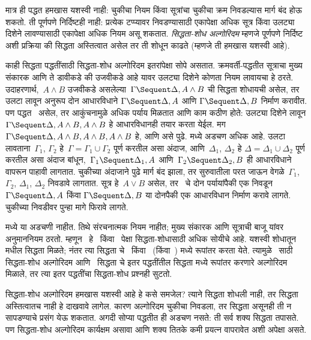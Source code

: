 मात्र ही पद्धत हमखास यशस्वी नाही:
चुकीचा नियम किंवा सूत्रांचा चुकीचा क्रम
निवडल्यास मार्ग बंद होऊ शकतो. ती पूर्णपणे
निर्दिष्टही नाही: प्रत्येक टप्प्यावर निवडण्यासाठी
एकापेक्षा अधिक सूत्र किंवा उलट्या दिशेने
लावण्यासाठी एकापेक्षा अधिक नियम असू शकतात.
\emph{सिद्धता-शोध अल्गोरिदम} म्हणजे पूर्णपणे
निर्दिष्ट अशी प्रक्रिया की सिद्धता अस्तित्वात
असेल तर ती शोधून काढते (म्हणजे ती हमखास यशस्वी आहे).

काही सिद्धता पद्धतींसाठी सिद्धता-शोध
अल्गोरिदम इतरांपेक्षा सोपे असतात. क्रमवर्ती-पद्धतीत
सूत्राचा मुख्य संकारक आणि ते डावीकडे
की उजवीकडे आहे यावर उलट्या दिशेने कोणता नियम
लावायचा हे ठरते. उदाहरणार्थ,~$A \land B$
उजवीकडे असलेल्या~$\Gamma \Sequent \Delta, A \land B$
ची सिद्धता शोधायची असेल, तर~\RightR{\land}
उलटा लावून अनुरूप दोन आधारविधाने
$\Gamma \Sequent \Delta, A$ आणि
$\Gamma \Sequent \Delta, B$ निर्माण करावीत.
पण पद्धत~ असेल, तर आकुंचनामुळे अधिक
पर्याय मिळतात आणि काम कठीण होते: उलट्या दिशेने
\RightR{\Contraction} लावून
$\Gamma \Sequent \Delta, A \land B, A \land B$
हे आधारविधानही तयार करता येईल. मग
$\Gamma \Sequent \Delta, A \land B, A \land B, A \land B$
हे, आणि असे पुढे.  मध्ये अडचण अधिक आहे.
\RightR{\land} उलटा लावताना~$\Gamma_1$, $\Gamma_2$
हे~$\Gamma = \Gamma_1 \cup \Gamma_2$ पूर्ण करतील
असा अंदाज, आणि~$\Delta_1$, $\Delta_2$ हे
$\Delta = \Delta_1 \cup \Delta_2$ पूर्ण करतील
असा अंदाज बांधून,~$\Gamma_1 \Sequent \Delta_1, A$
आणि~$\Gamma_2 \Sequent \Delta_2, B$ ही
आधारविधाने वापरून पाहावी लागतात. चुकीच्या अंदाजाने
पुढे मार्ग बंद झाला, तर सुरुवातीला परत जाऊन
वेगळे~$\Gamma_1$, $\Gamma_2$, $\Delta_1$, $\Delta_2$
निवडावे लागतात. सूत्र हे~$A \lor B$
असेल, तर~\RightR{\lor} चे दोन पर्यायांपैकी एक
निवडून~$\Gamma \Sequent \Delta, A$ किंवा
$\Gamma \Sequent \Delta, B$ या दोनपैकी
एक आधारविधान निर्माण करावे लागते. चुकीच्या
निवडीवर पुन्हा मागे फिरावे लागते.

 मध्ये या अडचणी नाहीत.
तिथे संरचनात्मक नियम नाहीत; मुख्य संकारक
आणि सूत्राची बाजू यांवर अनुमाननियम ठरतो.
म्हणून~ हे~ किंवा~
पेक्षा सिद्धता-शोधासाठी अधिक सोयीचे आहे.
यशस्वी शोधातून~ मधील सिद्धता मिळते;
नंतर त्या सिद्धता चे~ किंवा~
(किंवा~) मध्ये रूपांतर करता येते.
त्यामुळे~ साठी सिद्धता-शोध अल्गोरिदम
आणि~ सिद्धता चे इतर पद्धतींतील
सिद्धता मध्ये रूपांतर करणारे अल्गोरिदम मिळाले,
तर त्या इतर पद्धतींचा सिद्धता-शोध प्रश्नही सुटतो.

सिद्धता-शोध अल्गोरिदम हमखास यशस्वी आहे
हे कसे समजेल? त्याने सिद्धता शोधली नाही,
तर सिद्धता अस्तित्वातच नाही हे दाखवावे लागेल.
कारण अल्गोरिदम चुकीचा निवडला, तर सिद्धता
असूनही ती न सापडण्याचे प्रसंग येऊ शकतात.
अगदी सोप्या पद्धतीत ही अडचण नसते: ती सर्व
शक्य सिद्धता तपासते. पण सिद्धता-शोध
अल्गोरिदम कार्यक्षम असावा आणि शक्य तितके कमी
प्रयत्न वापरावेत अशी अपेक्षा असते.

